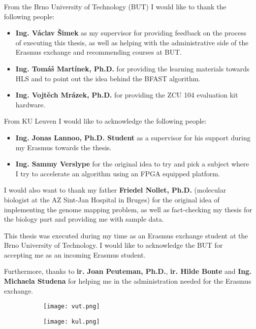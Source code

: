 From the Brno University of Technology (BUT) I would like to thank the following people:
\begin{itemize}
	\item \textbf{Ing. V\'aclav \v Simek} as my supervisor for providing feedback on the process of executing this thesis, as well as helping with the administrative side of the Erasmus exchange and recommending courses at BUT.
	\item \textbf{Ing. Tom\'a\v s Mart\'inek, Ph.D.} for providing the learning materials towards HLS and to point out the idea behind the BFAST algorithm.
	\item \textbf{Ing. Vojt\v ech Mr\'azek, Ph.D.} for providing the ZCU 104 evaluation kit hardware.
\end{itemize}

From KU Leuven I would like to acknowledge the following people:
\begin{itemize}
	\item \textbf{Ing. Jonas Lannoo,
		Ph.D. Student} as a supervisor for his support during my Erasmus towards the thesis.
	\item \textbf{Ing. Sammy Verslype} for the original idea to try and pick a subject where I try to accelerate an algorithm using an FPGA equipped platform.
\end{itemize} 

I would also want to thank my father \textbf{Friedel Nollet, Ph.D.} (molecular biologist at the AZ Sint-Jan Hospital in Bruges) for the original idea of implementing the genome mapping problem, as well as fact-checking my thesis for the biology part and providing me with sample data.

This thesis was executed during my time as an Erasmus exchange student at the Brno University of Technology. I would like to acknowledge the BUT for accepting me as an incoming Erasmus student.

Furthermore, thanks to \textbf{ir. Joan Peuteman, Ph.D.}, \textbf{ir. Hilde Bonte} and \textbf{Ing. Michaela Studena} for helping me in the administration needed for the Erasmus exchange.

\begin{figure}[H]
	\centering
	\begin{subfigure}[H]{0.3\textwidth}
		\texttt{[image: vut.png]}
	\end{subfigure}
\qquad
	\begin{subfigure}[H]{0.3\textwidth}
		\texttt{[image: kul.png]}
	\end{subfigure}
\end{figure}